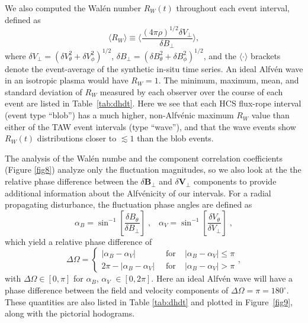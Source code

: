 \documentclass[preprint]{aastex62}
\begin{document}
We also computed the Wal\'{e}n number {$R_W(t)$} \citep{walen44} throughout each event interval, defined as
%
\begin{equation}
\big \langle R_W \big \rangle \equiv \bigg \langle \frac{(4\pi \rho)^{1/2} \delta V_{\perp}}{\delta B_{\perp}} \bigg \rangle ,
\end{equation}
%
where $\delta V_{\perp} = (\delta V_\theta^2 + \delta V_\phi^2)^{1/2}$, $\delta B_{\perp} = (\delta B_\theta^2 + \delta B_\phi^2)^{1/2}$, and the $\langle \cdot \rangle$ brackets denote the event-average of the synthetic in-situ time series. An ideal Alfv\'{e}n wave in an isotropic plasma would have $R_W = 1$. The minimum, maximum, {mean, and standard deviation} of $R_W$ {measured} by each observer over the course of each event are listed in Table~\ref{tab:dhdt}. Here we see that each {HCS flux-rope interval (event type ``blob'')} has a much higher, non-Alfv\'{e}nic maximum $R_W$ value than either of the {TAW event intervals (type ``wave'')}, and that the wave events show $R_W(t)$ distributions closer to {$\lesssim1$ than the blob events.}

The analysis of the Wal\'{e}n numbe and the component correlation coefficients (Figure \ref{fig8}) analyze only the fluctuation magnitudes, so we also look at the the relative phase difference between the $\delta \boldsymbol{B_{\perp}}$ and $\delta \boldsymbol{V_{\perp}}$ components to provide additional information about the Alfv\'{e}nicity of our intervals. For a radial propagating disturbance, the fluctuation phase angles are defined as 
\begin{equation}
\alpha_B = \sin^{-1}\left[ {\frac{\delta B_\theta}{ \delta B_{\perp}}} \right] \; , \;\;\; \alpha_V = \sin^{-1}\left[ {\frac{\delta V_\theta}{ \delta V_{\perp}}} \right] \; ,
\end{equation}
%
which yield a relative phase difference of
%
\begin{equation}
\Delta \Omega = \left \{ \begin{array}{lcl}
  			\left | \alpha_B - \alpha_V \right | \;\; & \mathrm{for} \; & \left | \alpha_B-\alpha_V \right | \le \pi  \\
  			2\pi - \left | \alpha_B - \alpha_V \right | \;\; & \mathrm{for} \; &  \left | \alpha_B-\alpha_V \right | > \pi
			 \end{array} \right. ,
\end{equation}
with $\Delta \Omega \in [0,\pi]$ for $\alpha_B$, $\alpha_V$ $\in [ 0, 2\pi ]$. Here an ideal Alfv\'{e}n wave will have a phase difference between the field and velocity components of $\Delta \Omega = \pi = 180^{\circ}$. These quantities are also listed in Table \ref{tab:dhdt} and plotted in Figure~\ref{fig9}, along with the pictorial hodograms.
\end{document}
